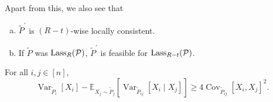 Apart from this, we also see that
\begin{enumerate}[(a)]
	\item \(\widetilde{P} ^\prime \) is \((R-t)\)-wise locally consistent.
	\item If \(\widetilde{P} \) was \(\mathop{\mathrm{Lass}}_R(\mathcal{\MakeUppercase{p}})\), \(\widetilde{P} ^\prime \) is feasible for \(\mathop{\mathrm{Lass}}_{R-t} (\mathcal{\MakeUppercase{p}})\).
\end{enumerate}

\begin{lemma}\label{lma:conditioning-reduces-variance}
	For all \(i, j\in [n]\),
	\[
		\mathop{\mathrm{Var}}\nolimits_{\widetilde{P} _i}\left[X_i \right] - \mathbb{E}_{X_j\sim \widetilde{P} _j}\left[\mathop{\mathrm{Var}}\nolimits_{\widetilde{P} _{ij}}\left[X_i \mid X_j \right]  \right] \geq 4\mathop{\mathrm{Cov}}\nolimits_{\widetilde{P} _{ij}}\left[ X_i, X_j\right] ^{2} .
	\]
\end{lemma}
